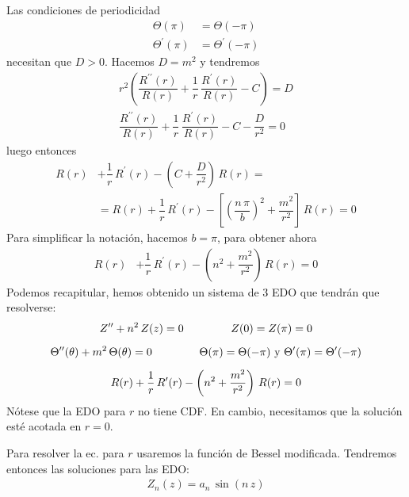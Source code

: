 Las condiciones de periodicidad
\begin{align*}
\Theta (\pi) &= \Theta (- \pi) \\[0.5em]
\Theta^{\prime} (\pi) &= \Theta^{\prime} (- \pi)
\end{align*}
necesitan que $D > 0$. Hacemos $D = m^{2}$ y tendremos
\begin{align*}
r^{2} \left( \dfrac{R^{\prime \prime}(r)}{R(r)} + \dfrac{1}{r} \, \dfrac{R^{\prime} (r)}{R (r)}  - C\right) = D \\[0.25em]
\dfrac{R^{\prime \prime}(r)}{R(r)} + \dfrac{1}{r} \, \dfrac{R^{\prime} (r)}{R (r)}  - C - \dfrac{D}{r^{2}} = 0
\end{align*}
luego entonces
\begin{align*}
R (r) &+ \dfrac{1}{r} \, R^{\prime} (r) - \left( C + \dfrac{D}{r^{2}} \right) \, R(r) = \\[0.5em]
&= R (r) + \dfrac{1}{r} \, R^{\prime} (r) - \left[ \left( \dfrac{n \, \pi}{b} \right)^{2} + \dfrac{m^{2}}{r^{2}} \right] \, R(r) = 0
\end{align*}
Para simplificar la notación, hacemos $b = \pi$, para obtener ahora
\begin{align*}
R (r) &+ \dfrac{1}{r} \, R^{\prime} (r) - \left( n^{2} + \dfrac{m^{2}}{r^{2}} \right) \, R (r) = 0
\end{align*}
Podemos recapitular, hemos obtenido un sistema de 3 EDO que tendrán que resolverse:
\begin{align}
\begin{gathered}
Z^{\prime \prime} + n^{2} \, Z (z) = 0 \hspace{1.5cm} Z(0) = Z(\pi) = 0 \\[0.5em]
\Theta^{\prime \prime} (\theta) + m^{2} \, \Theta (\theta) = 0 \hspace{1.5cm} \Theta (\pi) = \Theta (- \pi) \mbox{ y }
\Theta^{\prime} (\pi) = \Theta^{\prime} (- \pi) \\[0.5em]
R (r) + \dfrac{1}{r} \, R^{\prime} (r) - \left( n^{2} + \dfrac{m^{2}}{r^{2}} \right) \, R (r) = 0
\end{gathered}
\label{eq:ecuacion_019}
\end{align}
Nótese que la EDO para $r$ no tiene CDF. En cambio, necesitamos que la solución esté acotada en $r = 0$.
\par
Para resolver la ec. para $r$ usaremos la función de Bessel modificada. Tendremos entonces las soluciones para las EDO:
\begin{align*}
Z_{n} (z) = a_{n} \, \sin (n \, z)
\end{align*}
